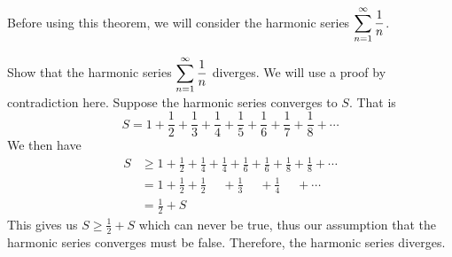 Before using this theorem, we will consider the harmonic series $\displaystyle\sum_{n=1}^\infty\frac1n$.

\begin{example}\label{ex_harm_series}%
Show that the harmonic series $\displaystyle \sum_{n=1}^\infty\frac1n$ diverges.
\solution
We will use a proof by contradiction here. Suppose the harmonic series converges to $S$. That is
\[S=1+\frac12+ \frac13 +\frac14+\frac15+\frac16+\frac17+\frac18+\dotsb\]
We then have
\begin{align*}
S &\geq 1+\frac12+\frac14+\frac14+\frac16+\frac16+\frac18+\frac18+\dotsb\\
&=1+\frac12+\frac12\phantom{+\frac14}+\frac13\phantom{+\frac16}
+\frac14\phantom{+\frac18}+\dotsb\\
&=\frac12+S
\end{align*}
This gives us $S\geq \frac12+S$ which can never be true, thus our assumption that the harmonic series converges must be false. Therefore, the harmonic series diverges.
\end{example}

